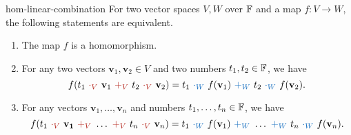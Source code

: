 \begin{lemma}{}{hom-linear-combination}
 For two vector spaces $V,W$ over $\mathbb{F}$ and a map $f:V \to W$, the following
 statements are equivalent.
 \begin{enumerate}[label=(\alph*)]
  \item The map $f$ is a homomorphism.
  \item For any two vectors $\mathbf{v}_1,\mathbf{v}_2 \in V$ and two numbers
   $t_1,t_2 \in \mathbb{F}$, we have
   \[
    f(t_1~\clr{ \cdot _V}~\mathbf{v}_1~\clr{+_V}~t_2~\clr{ \cdot
    _V}~\mathbf{v}_2) = t_1~\clb{ \cdot
    _W}~f(\mathbf{v}_1)~\clb{+_W}~t_2~\clb{ \cdot _W}~f(\mathbf{v}_2).
   \]
  \item For any vectors $\mathbf{v}_1,\ldots,\mathbf{v}_n$ and numbers
   $t_1,\ldots,t_n \in \mathbb{F}$, we have
   \[
    f(t_1~\clr{ \cdot_V}~\mathbf{v_1}~\clr{ + _V}~\ldots~\clr{ +_V}~t_n~\clr{
    \cdot _V}~\mathbf{v}_n) = t_1~\clb{ \cdot
    _W}~f(\mathbf{v}_1)~\clb{+_W}~\ldots~\clb{+_W}~t_n~\clb{ \cdot
    _W}~f(\mathbf{v}_n).
   \]
 \end{enumerate}
\end{lemma}
